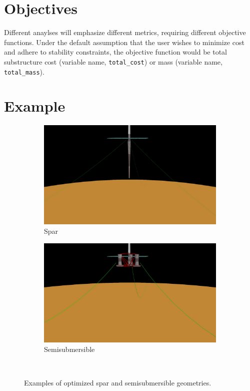 \section{Objectives}
Different anaylses will emphasize different metrics, requiring different
objective functions.  Under the default assumption that the user wishes
to minimize cost and adhere to stability constraints, the objective
function would be total substructure cost (variable name,
\texttt{total\_cost}) or mass (variable name, \texttt{total\_mass}).

\section{Example}

\begin{figure}[htb]
  \begin{subfigure}[b]{0.49\linewidth}
    \centering \includegraphics[width=\linewidth]{figs/spar-psqp.jpg}
    \caption{Spar}
  \end{subfigure}
  \begin{subfigure}[b]{0.49\linewidth}
    \centering \includegraphics[width=\linewidth]{figs/semi-psqp.jpg}
    \caption{Semisubmersible}
  \end{subfigure}\\
  \caption{Examples of optimized spar and semisubmersible geometries.}
  \label{fig:optex}
\end{figure}

